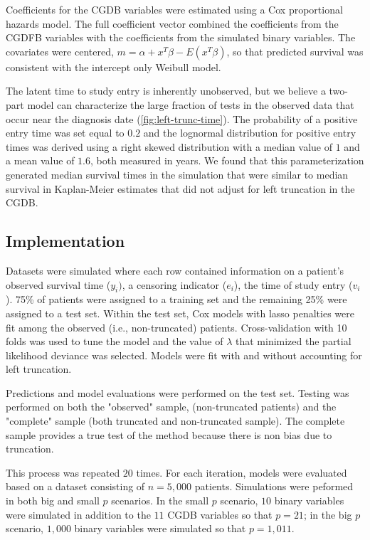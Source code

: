 \documentclass[11pt,final,fleqn]{article}\usepackage[]{graphicx}\usepackage[]{color}
\theoremstyle{plain}
\begin{document}
Coefficients for the CGDB variables were estimated using a Cox proportional hazards model. The full coefficient vector combined the coefficients from the CGDFB variables with the coefficients from the simulated binary variables. The covariates were centered, $m = \alpha + x^T\beta - E(x^T\beta)$, so that predicted survival was consistent with the intercept only Weibull model.

The latent time to study entry is inherently unobserved, but we believe a two-part model can characterize the large fraction of tests in the observed data that occur near the diagnosis date  (\autoref{fig:left-trunc-time}). The probability of a positive entry time was set equal to $0.2$ and the lognormal distribution for positive entry times was derived using a right skewed distribution with a median value of $1$ and a mean value of $1.6$, both measured in years.  We found that this parameterization generated median survival times in the simulation that were similar to median survival in Kaplan-Meier estimates that did not adjust for left truncation in the CGDB.

\subsection{Implementation}
Datasets were simulated where each row contained information on a patient's observed survival time ($y_i)$, a censoring indicator ($e_i$), the time of study entry ($v_i$). 75\%  of patients were assigned to a training set and the remaining 25\% were assigned to a test set. Within the test set, Cox models with lasso penalties were fit among the observed (i.e., non-truncated) patients. Cross-validation with 10 folds was used to tune the  model and the value of $\lambda$ that minimized the partial likelihood deviance was selected. Models were fit with and without accounting for left truncation. 

Predictions and model evaluations were performed on the test set. Testing was performed on both the "observed" sample, (non-truncated patients) and the "complete" sample (both truncated and non-truncated sample). The complete sample provides a true test of the method because there is non bias due to truncation. 

This process was repeated $20$ times. For each iteration, models were evaluated based on a dataset consisting of $n=5,000$ patients. Simulations were peformed in both big and small $p$ scenarios. In the small $p$ scenario, $10$ binary variables were simulated in addition to the $11$ CGDB variables so that $p=21$; in the big $p$ scenario, $1,000$ binary variables were simulated so that $p=1,011$.
\end{document}
